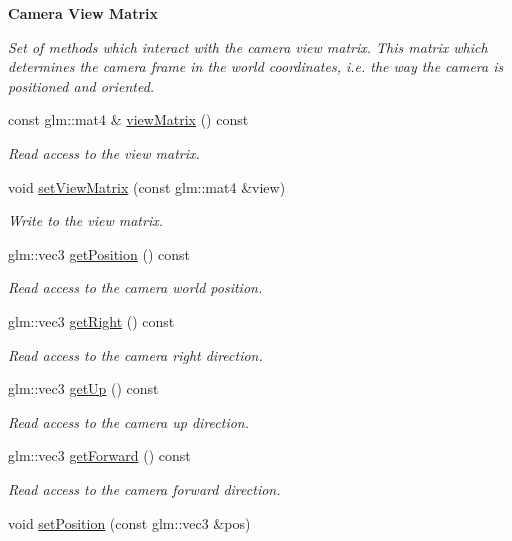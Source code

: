 \begin{Indent}{\bf Camera View Matrix}\par
{\em Set of methods which interact with the camera view matrix. This matrix which determines the camera frame in the world coordinates, i.\+e. the way the camera is positioned and oriented. }\begin{DoxyCompactItemize}
\item 
const glm\+::mat4 \& \hyperlink{classCamera_aba6abae81f71ffdc830a0c45a6910c76}{view\+Matrix} () const 
\begin{DoxyCompactList}\small\item\em Read access to the view matrix. \end{DoxyCompactList}\item 
void \hyperlink{classCamera_a9b4e9d0087f56802ec4d684ea9665e16}{set\+View\+Matrix} (const glm\+::mat4 \&view)
\begin{DoxyCompactList}\small\item\em Write to the view matrix. \end{DoxyCompactList}\item 
glm\+::vec3 \hyperlink{classCamera_ad741cb975e8ea88698ed1b0216a0bb82}{get\+Position} () const 
\begin{DoxyCompactList}\small\item\em Read access to the camera world position. \end{DoxyCompactList}\item 
glm\+::vec3 \hyperlink{classCamera_af8c18525d561cda9757413550436f5ca}{get\+Right} () const 
\begin{DoxyCompactList}\small\item\em Read access to the camera right direction. \end{DoxyCompactList}\item 
glm\+::vec3 \hyperlink{classCamera_a64b7a4bf8c463fd6ba5165d632d54a8e}{get\+Up} () const 
\begin{DoxyCompactList}\small\item\em Read access to the camera up direction. \end{DoxyCompactList}\item 
glm\+::vec3 \hyperlink{classCamera_aab4704e0cfa1fb4153658f129d806e78}{get\+Forward} () const 
\begin{DoxyCompactList}\small\item\em Read access to the camera forward direction. \end{DoxyCompactList}\item 
void \hyperlink{classCamera_ab7ebcdd5020d8057f1df3bdb33bac456}{set\+Position} (const glm\+::vec3 \&pos)

\end{DoxyCompactItemize}
\end{Indent}
